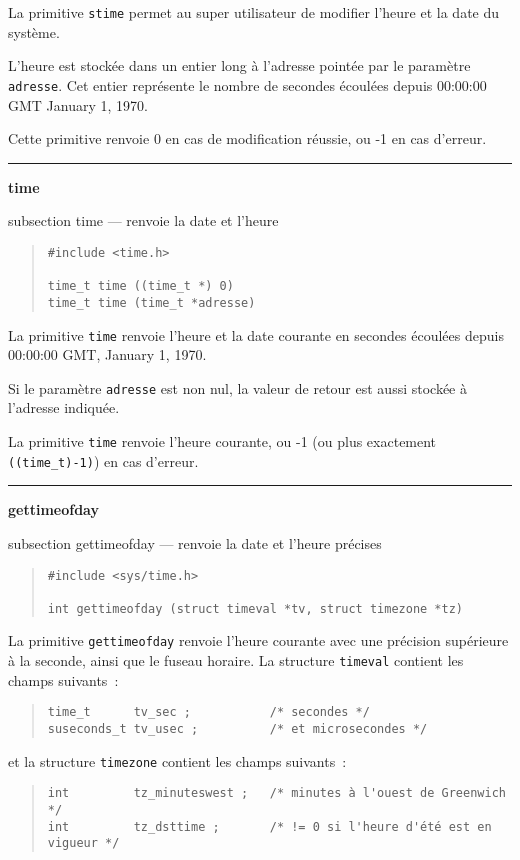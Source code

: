 \documentclass [twoside] {report}
\newcommand {\primitive} [1]
    {
	{\large \bf #1}
	\addcontentsline {toc} {subsection} {#1}
    }
\newcommand {\separation}
    {
	\vspace {7mm}
	\nopagebreak
	\hrule
    }
\begin{document}
La primitive {\tt stime} permet au super
utilisateur de modifier l'heure et la date du
système.

L'heure est stockée dans un entier long à
l'adresse pointée par le paramètre {\tt adresse}. Cet
entier représente le nombre de secondes écoulées
depuis 00:00:00 GMT January 1, 1970.

Cette primitive renvoie 0 en cas de modification
réussie, ou -1 en cas d'erreur.




\separation
\primitive {time} --- renvoie la date et l'heure

\begin {quote}
\begin {verbatim}
#include <time.h>

time_t time ((time_t *) 0)
time_t time (time_t *adresse)
\end{verbatim}
\end {quote}

La primitive {\tt time} renvoie l'heure et la date
courante en secondes écoulées depuis
00:00:00 GMT, January 1, 1970.

Si le paramètre {\tt adresse} est non nul, la valeur
de retour est aussi stockée à l'adresse
indiquée.

La primitive \texttt {time} renvoie l'heure courante, ou -1 (ou plus
exactement \verb|((time_t)-1)|) en cas d'erreur.


\separation
\primitive {gettimeofday} --- renvoie la date et l'heure précises

\begin {quote}
\begin {verbatim}
#include <sys/time.h>

int gettimeofday (struct timeval *tv, struct timezone *tz)
\end{verbatim}
\end {quote}


La primitive \texttt {gettimeofday} renvoie l'heure courante avec une
précision supérieure à la seconde, ainsi que le fuseau horaire. La
structure \texttt {timeval} contient les champs suivants~:
\begin {quote}
\begin {verbatim}
time_t      tv_sec ;           /* secondes */
suseconds_t tv_usec ;          /* et microsecondes */
\end{verbatim}
\end {quote}
et la structure \texttt {timezone} contient les champs suivants~:
\begin {quote}
\begin {verbatim}
int         tz_minuteswest ;   /* minutes à l'ouest de Greenwich */
int         tz_dsttime ;       /* != 0 si l'heure d'été est en vigueur */
\end{verbatim}
\end {quote}
\end{document}

